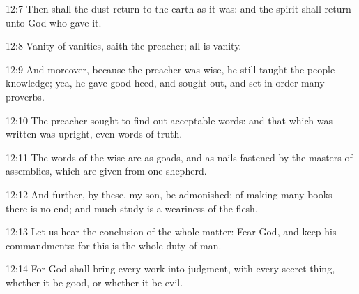 12:7 Then shall the dust return to the earth as it was: and the spirit
shall return unto God who gave it.

12:8 Vanity of vanities, saith the preacher; all is vanity.

12:9 And moreover, because the preacher was wise, he still taught the
people knowledge; yea, he gave good heed, and sought out, and set in
order many proverbs.

12:10 The preacher sought to find out acceptable words: and that which
was written was upright, even words of truth.

12:11 The words of the wise are as goads, and as nails fastened by the
masters of assemblies, which are given from one shepherd.

12:12 And further, by these, my son, be admonished: of making many
books there is no end; and much study is a weariness of the flesh.

12:13 Let us hear the conclusion of the whole matter: Fear God, and
keep his commandments: for this is the whole duty of man.

12:14 For God shall bring every work into judgment, with every secret
thing, whether it be good, or whether it be evil.

